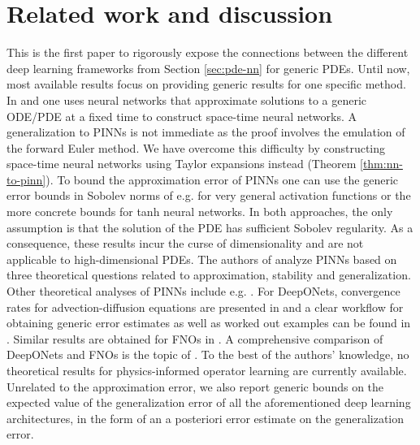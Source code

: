 \documentclass{article}
\numberwithin{equation}{section}
\newcommand{\1}{\mathbbm{1}}
\begin{document}
\section{Related work and discussion}\label{sec:discussion}




This is the first paper to rigorously expose the connections between the different deep learning frameworks from Section \ref{sec:pde-nn} for generic PDEs.
Until now, most available results focus on providing generic results for one specific method. In \cite{hornung2020space} and \cite{grohs2019space} one uses neural networks that approximate solutions to a generic ODE/PDE at a fixed time to construct space-time neural networks. A generalization to PINNs is not immediate as the proof involves the emulation of the forward Euler method. We have overcome this difficulty by constructing space-time neural networks using Taylor expansions instead (Theorem \ref{thm:nn-to-pinn}). To bound the approximation error of PINNs one can use the generic error bounds in Sobolev norms of e.g. \cite{guhring2020error, guhring2021approximation} for very general activation functions or the more concrete bounds \cite{deryck2021approximation} for tanh neural networks. In both approaches, the only assumption is that the solution of the PDE has sufficient Sobolev regularity. As a consequence, these results incur the curse of dimensionality and are not applicable to high-dimensional PDEs. The authors of \cite{deryck2021approximation} analyze PINNs based on three theoretical questions related to approximation, stability and generalization. Other theoretical analyses of PINNs include e.g. \cite{shin2020convergence, Zhang1, hillebrecht2022certified}. 
For DeepONets, convergence rates for advection-diffusion equations are presented in \cite{deng2021convergence} and a clear workflow for obtaining generic error estimates as well as worked out examples can be found in \cite{LMK1}. Similar results are obtained for FNOs in \cite{kovachki2021universal}. A comprehensive comparison of DeepONets and FNOs is the topic of \cite{fair}. To the best of the authors' knowledge, no theoretical results for physics-informed operator learning are currently available. Unrelated to the approximation error, we also report generic bounds on the expected value of the generalization error of all the aforementioned deep learning architectures, in the form of an a posteriori error estimate on the generalization error. 
\end{document}
